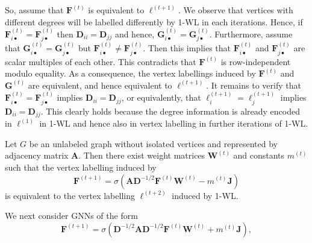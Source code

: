 So, assume that  $\mathbf{F}^{(t)}$ is equivalent to $\ell^{(t+1)}$. We observe that vertices with different degrees will be labelled differently by 1-WL in each iterations. Hence,  if $\mathbf{F}^{(t)}_{i\bullet}=\mathbf{F}^{(t)}_{j\bullet}$ then $\mathbf{D}_{ii}=\mathbf{D}_{jj}$ and hence, $\mathbf{G}^{(t)}_{i\bullet}=\mathbf{G}^{(t)}_{j\bullet}$. Furthermore, assume that $\mathbf{G}^{(t)}_{i\bullet}= \mathbf{G}^{(t)}_{j\bullet}$ but $\mathbf{F}^{(t)}_{i\bullet}\neq \mathbf{F}^{(t)}_{j\bullet}$. Then this implies that  $\mathbf{F}^{(t)}_{i\bullet}$ and $\mathbf{F}^{(t)}_{j\bullet}$ are scalar multiples of each other. This contradicts that  $\mathbf{F}^{(t)}$ is row-independent modulo equality. As a consequence, the vertex labellings induced by  $\mathbf{F}^{(t)}$ and $\mathbf{G}^{(t)}$ are equivalent, and hence equivalent to $\ell^{(t+1)}$.  It remains to verify that $\mathbf{F}^{(t)}_{i\bullet}=\mathbf{F}^{(t)}_{j\bullet}$ implies $\mathbf{D}_{ii}=\mathbf{D}_{jj}$, or equivalently, that 
    $\ell^{(t+1)}_i=\ell^{(t+1)}_j$ implies $\mathbf{D}_{ii}=\mathbf{D}_{jj}$. This clearly holds because the degree information is already encoded in $\ell^{(1)}$ in 1-WL and hence also in vertex labelling in further iterations of 1-WL.

\begin{proposition}
Let $G$ be an unlabeled graph without isolated vertices and represented by adjacency matrix $\mathbf{A}$. Then there exist weight matrices $\mathbf{W}^{(t)}$
and constants $m^{(t)}$ such that the  vertex labelling induced by 
\begin{equation}
  \mathbf{F}^{(t+1)} = \sigma\left(
    \mathbf{A}\mathbf{D}^{-1/2}\mathbf{F}^{(t)}\mathbf{W}^{(t)} - m^{(t)}\mathbf{J}  \right)
\end{equation}
is equivalent to the vertex labelling $\ell^{(t+2)}$ induced by 1-WL.
\end{proposition}

We next consider GNNs of the form 
\begin{equation}
    \mathbf{F}^{(t+1)} = \sigma\left(
        \mathbf{D}^{-1/2}\mathbf{A}\mathbf{D}^{-1/2}
        \mathbf{F}^{(t)}\mathbf{W}^{(t)} + m^{(t)}\mathbf{J}
    \right),
\end{equation}


